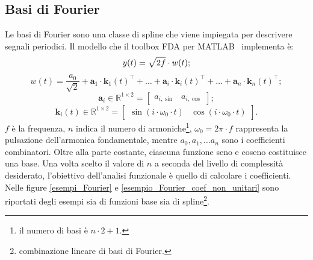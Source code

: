 \subsection[Basi di Fourier]{Basi di Fourier}
Le basi di Fourier sono una classe di spline che viene impiegata per descrivere segnali periodici. Il modello che il toolbox FDA per MATLAB~\cite{paper_FDA_toolbox} implementa è:
\[
	y(t) = \sqrt{2f}\cdot w(t)\\;
\]
\[
	w(t) = \frac{a_0}{\sqrt{2}} + \mathbf{a}_1\cdot \mathbf{k}_1(t)^\top +\dots + \mathbf{a}_i\cdot \mathbf{k}_i(t)^\top + \dots + \mathbf{a}_n\cdot \mathbf{k}_n(t)^\top;
\]
\[
	\mathbf{a}_i\in\mathbb{R}^{1\times2} =
	\begin{bmatrix}
		a_{i, \sin} & a_{i, \cos}
	\end{bmatrix};
\]
\[
	\mathbf{k}_i(t)\in\mathbb{R}^{1\times 2} =
	\begin{bmatrix}
		\sin\left(i\cdot\omega_0\cdot t\right) & \cos\left(i\cdot\omega_0\cdot t\right)
	\end{bmatrix}.
\]
$f$ è la frequenza, $n$ indica il numero di armoniche\footnote{il numero di basi è $n\cdot 2 + 1$.}, $\omega_0 = 2\pi\cdot f$ rappresenta la pulsazione dell'armonica fondamentale, mentre $a_0, a_1,\dots a_n$ sono i coefficienti combinatori. Oltre alla parte costante, ciascuna funzione seno e coseno costituisce una base. Una volta scelto il valore di $n$ a seconda del livello di complessità desiderato, l'obiettivo dell'analisi funzionale è quello di calcolare i coefficienti. Nelle figure \ref{esempi_Fourier} e \ref{esempio_Fourier_coef_non_unitari} sono riportati degli esempi sia di funzioni base sia di spline\footnote{combinazione lineare di basi di Fourier.}.

